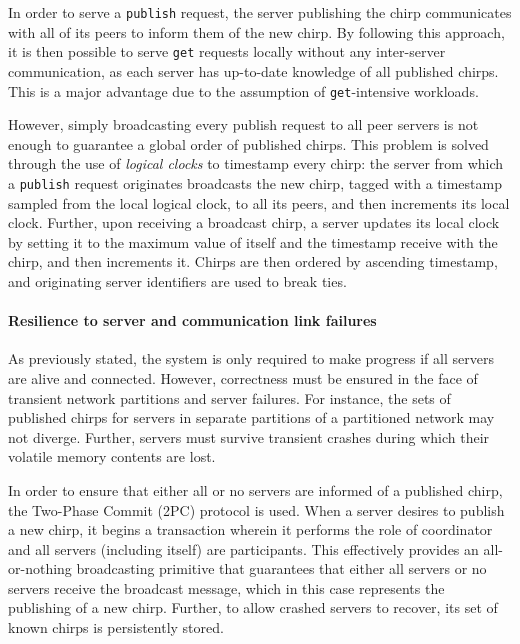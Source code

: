 In order to serve a \texttt{publish} request, the server publishing the chirp communicates with all of its peers to inform them of the new chirp. By following this approach, it is then possible to serve \texttt{get} requests locally without any inter-server communication, as each server has up-to-date knowledge of all published chirps. This is a major advantage due to the assumption of \texttt{get}-intensive workloads.

However, simply broadcasting every publish request to all peer servers is not enough to guarantee a global order of published chirps. This problem is solved through the use of \emph{logical clocks} to timestamp every chirp: the server from which a \texttt{publish} request originates broadcasts the new chirp, tagged with a timestamp sampled from the local logical clock, to all its peers, and then increments its local clock. Further, upon receiving a broadcast chirp, a server updates its local clock by setting it to the maximum value of itself and the timestamp receive with the chirp, and then increments it. Chirps are then ordered by ascending timestamp, and originating server identifiers are used to break ties.


\paragraph{Resilience to server and communication link failures}

As previously stated, the system is only required to make progress if all servers are alive and connected. However, correctness must be ensured in the face of transient network partitions and server failures. For instance, the sets of published chirps for servers in separate partitions of a partitioned network may not diverge. Further, servers must survive transient crashes during which their volatile memory contents are lost.

In order to ensure that either all or no servers are informed of a published chirp, the Two-Phase Commit (2PC) protocol is used. When a server desires to publish a new chirp, it begins a transaction wherein it performs the role of coordinator and all servers (including itself) are participants. This effectively provides an all-or-nothing broadcasting primitive that guarantees that either all servers or no servers receive the broadcast message, which in this case represents the publishing of a new chirp. Further, to allow crashed servers to recover, its set of known chirps is persistently stored.


